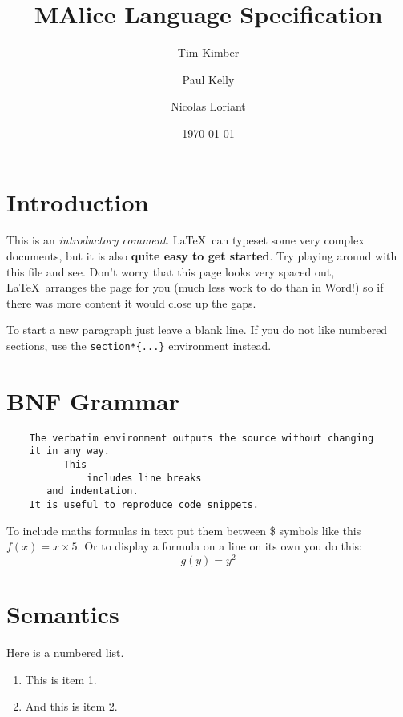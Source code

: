 \documentclass[a4wide, 11pt]{article}
\begin{document}
\title{MAlice Language Specification}

\author{Tim Kimber \and Paul Kelly \and Nicolas Loriant}

\date{\today}         %

\maketitle            %

\section{Introduction}

This is an \emph{introductory comment}.
\LaTeX\ can typeset some very complex documents, but it is also
\textbf{quite easy to get started}.
Try playing around with this file and see. 
Don't worry that this page looks very spaced out,
\LaTeX\ arranges the page for you (much less work to do than in Word!)
so if there was more content it would close up the gaps.

To start a new paragraph just leave a blank line.
If you do not like numbered sections, use the \texttt{section*\{...\}}
environment instead.

\section{BNF Grammar} 

\begin{verbatim}
    The verbatim environment outputs the source without changing
    it in any way. 
          This
              includes line breaks
       and indentation. 
    It is useful to reproduce code snippets.
\end{verbatim}

To include maths formulas in text put them between \$ symbols like this
$f(x) = x \times 5$.
Or to display a formula on a line on its own you do this:
\[
    g(y) = y^2
\]

\section{Semantics}

Here is a numbered list.

\begin{enumerate}

    \item
    This is item 1.
    
    \item
    And this is item 2.
    
\end{enumerate}
\end{document}
